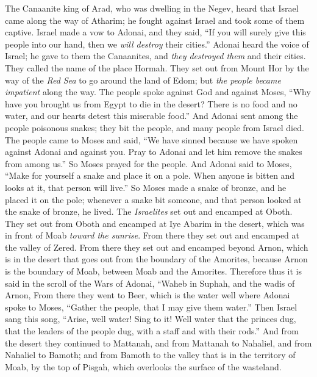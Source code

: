 \begin{biblechapter} %
 The Canaanite king of Arad, who was dwelling in the Negev, heard that Israel came along the way of Atharim; he fought against Israel and took some of them captive.
\verse Israel made a vow to Adonai, and they said, “If you will surely give this people into our hand, then we \textit{will destroy} their cities.”
\verse Adonai heard the voice of Israel; he gave to them the Canaanites, and \textit{they destroyed them} and their cities. They called the name of the place Hormah.
\verse They set out from Mount Hor by the way of the \textit{Red Sea} to go around the land of Edom; but \textit{the people became impatient} along the way.
\verse The people spoke against God and against Moses, “Why have you brought us from Egypt to die in the desert? There is no food and no water, and our hearts detest this miserable food.”
 And Adonai sent among the people poisonous snakes; they bit the people, and many people from Israel died.
\verse The people came to Moses and said, “We have sinned because we have spoken against Adonai and against you. Pray to Adonai and let him remove the snakes from among us.” So Moses prayed for the people.
\verse And Adonai said to Moses, “Make for yourself a snake and place it on a pole. When anyone is bitten and looks at it, that person will live.”
\verse So Moses made a snake of bronze, and he placed it on the pole; whenever a snake bit someone, and that person looked at the snake of bronze, he lived.
\verse The \textit{Israelites} set out and encamped at Oboth.
\verse They set out from Oboth and encamped at Iye Abarim in the desert, which was in front of Moab \textit{toward the sunrise}.
\verse From there they set out and encamped at the valley of Zered.
\verse From there they set out and encamped beyond Arnon, which is in the desert that goes out from the boundary of the Amorites, because Arnon is the boundary of Moab, between Moab and the Amorites.
\verse Therefore thus it is said in the scroll of the Wars of Adonai,
\verse “Waheb in Suphah, 
and the wadis of Arnon,
\verse From there they went to Beer, which is the water well where Adonai spoke to Moses, “Gather the people, that I may give them water.”
\verse Then Israel sang this song, “Arise, well water! Sing to it!
\verse Well water that the princes dug, that the leaders of the people dug, with a staff and with their rods.” And from the desert they continued to Mattanah,
\verse and from Mattanah to Nahaliel, and from Nahaliel to Bamoth;
\verse and from Bamoth to the valley that is in the territory of Moab, by the top of Pisgah, which overlooks the surface of the wasteland.

\end{biblechapter}
